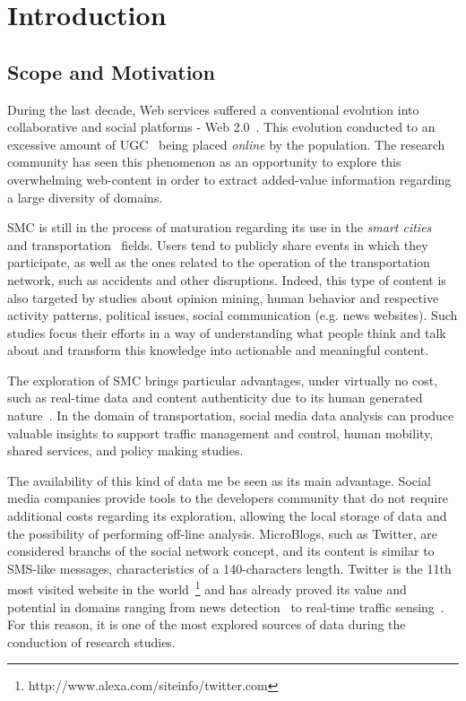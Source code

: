 \chapter{Introduction} \label{chap:intro}

\minitoc \mtcskip \noindent

\section{Scope and Motivation}\label{sec:scope_motivation}

During the last decade, Web services suffered a conventional evolution into collaborative and social platforms - Web 2.0~\cite{chi2008social}. This evolution conducted to an excessive amount of \gls{UGC}~\cite{kaplan2010users} being placed \textit{online} by the population. The research community has seen this phenomenon as an opportunity to explore this overwhelming web-content in order to extract added-value information regarding a large diversity of domains.

\gls{SMC} is still in the process of maturation regarding its use in the \textit{smart cities}~\cite{batty2012smart} and transportation~\cite{gal2014potential} fields. Users tend to publicly share events in which they participate, as well as the ones related to the operation of the transportation network, such as accidents and other disruptions. Indeed, this type of content is also targeted by studies about opinion mining, human behavior and respective activity patterns, political issues, social communication (e.g. news websites). Such studies focus their efforts in a way of understanding what people think and talk about and transform this knowledge into actionable and meaningful content. 

The exploration of \gls{SMC} brings particular advantages, under virtually no cost, such as real-time data and content authenticity due to its human generated nature~\cite{kuflik2017automating}. In the domain of transportation, social media data analysis can produce valuable insights to support traffic management and control, human mobility, shared services, and policy making studies. 

The availability of this kind of data me be seen as its main advantage. Social media companies provide tools to the developers community that do not require additional costs regarding its exploration, allowing the local storage of data and the possibility of performing off-line analysis. \glspl{MicroBlog}, such as Twitter, are considered branchs of the social network concept, and its content is similar to SMS-like messages, characteristics of a 140-characters length. Twitter is the 11th most visited website in the world~\footnote{http://www.alexa.com/siteinfo/twitter.com} and has already proved its value and potential in domains ranging from news detection~\cite{kn:Sankaranarayanan2009} to real-time traffic sensing~\cite{carvalho2010real}. For this reason, it is one of the most explored sources of data during the conduction of research studies.


